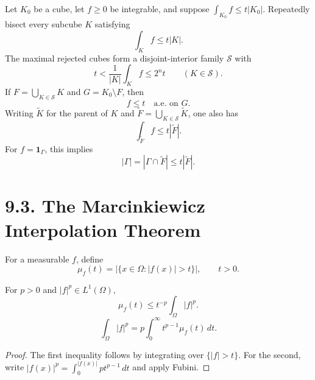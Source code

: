 Let $K_0$ be a cube, let $f\ge0$ be integrable, and suppose
$\int_{K_0}f\le t|K_0|$.  Repeatedly bisect every subcube $K$ satisfying
\begin{equation}\tag{9.16}
\int_K f\le t|K|.
\end{equation}
The maximal rejected cubes form a disjoint-interior family $\mathcal S$ with
\begin{equation}\tag{9.17}
t<\frac1{|K|}\int_Kf\le2^nt
\qquad(K\in\mathcal S).
\end{equation}
If $F=\bigcup_{K\in\mathcal S}K$ and $G=K_0\setminus F$, then
\begin{equation}\tag{9.18}
f\le t\quad\text{a.e. on }G.
\end{equation}
Writing $\widetilde K$ for the parent of $K$ and
$\widetilde F=\bigcup_{K\in\mathcal S}\widetilde K$, one also has
\begin{equation}\tag{9.19}
\int_{\widetilde F}f\le t|\widetilde F|.
\end{equation}
For $f=\mathbf1_\Gamma$, this implies
\begin{equation}\tag{9.20}
|\Gamma|=|\Gamma\cap\widetilde F|\le t|\widetilde F|.
\end{equation}

\section*{9.3. The Marcinkiewicz Interpolation Theorem}

For a measurable $f$, define
\begin{equation}\tag{9.21}
\mu_f(t)=|\{x\in\Omega:|f(x)|>t\}|,
\qquad t>0.
\end{equation}

\begin{lemma}
\label{gt-ch09-lem-distribution-function-identities}
For $p>0$ and $|f|^p\in L^1(\Omega)$,
\begin{equation}
\mu_f(t)\le t^{-p}\int_\Omega|f|^p.
\tag{9.22}
\end{equation}
\begin{equation}
\int_\Omega|f|^p=p\int_0^\infty t^{p-1}\mu_f(t)\,dt.
\tag{9.23}
\end{equation}
\end{lemma}
\begin{proof}
\sketch The first inequality follows by integrating over $\{|f|>t\}$.
For the second, write
$|f(x)|^p=\int_0^{|f(x)|}pt^{p-1}\,dt$ and apply Fubini.
\end{proof}

